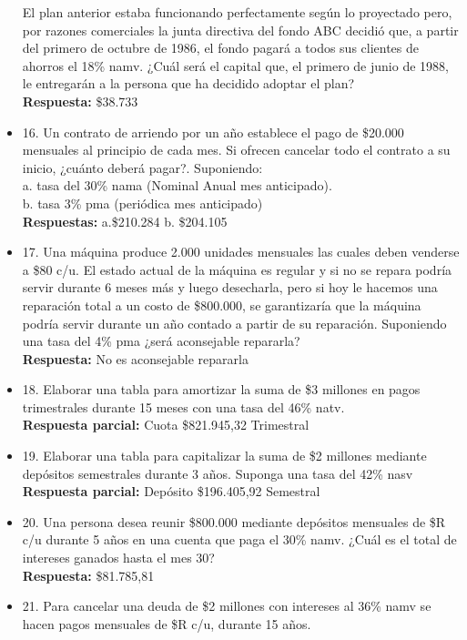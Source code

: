 \begin{itemize}
	El plan anterior estaba funcionando perfectamente según lo proyectado pero, por razones comerciales la junta directiva del fondo ABC decidió que, a partir del primero de octubre de 1986, el fondo pagará a todos sus clientes de ahorros el 18\% namv. ¿Cuál será el capital que, el primero de junio de 1988, le entregarán a la persona que ha decidido adoptar el plan?\\
	
	\textbf{Respuesta:} \$38.733\\
	\medskip
	\item 16. Un contrato de arriendo por un año establece el pago de \$20.000 mensuales al principio de cada mes. Si ofrecen cancelar todo el contrato a su inicio, ¿cuánto deberá pagar?. Suponiendo:\\
	
	a. tasa del 30\% nama (Nominal Anual mes anticipado).\\
	b. tasa 3\% pma (periódica mes anticipado)\\
	\textbf{Respuestas:} a.\$210.284 \hspace{1,5 cm} b. \$204.105\\
	\medskip
	\item 17. Una máquina produce 2.000 unidades mensuales las cuales deben venderse a \$80 c/u. El estado actual de la máquina es regular y si no se repara podría servir durante 6 meses más y luego desecharla, pero si hoy le hacemos una reparación total a un costo de \$800.000, se garantizaría que la máquina podría servir durante un año contado a partir de su reparación. Suponiendo una tasa del 4\% pma ¿será aconsejable repararla?\\
	\textbf{Respuesta:} No es aconsejable repararla\\
	\medskip
	\item 18. Elaborar una tabla para amortizar la suma de \$3 millones en pagos trimestrales durante 15 meses con una tasa del 46\% natv.\\
	\textbf{Respuesta parcial:} Cuota \$821.945,32 Trimestral\\
	\medskip
	\item 19. Elaborar una tabla para capitalizar la suma de \$2 millones mediante depósitos semestrales durante 3 años. Suponga una tasa del 42\% nasv\\
	\textbf{Respuesta parcial:} Depósito \$196.405,92 Semestral\\
	\medskip
	\item 20. Una persona desea reunir \$800.000 mediante depósitos mensuales de \$R c/u durante 5 años en una cuenta que paga el 30\% namv. ¿Cuál es el total de intereses ganados hasta el mes 30?\\
	\textbf{Respuesta:} \$81.785,81\\
	\medskip
	\item 21. Para cancelar una deuda de \$2 millones con intereses al 36\% namv se hacen pagos mensuales de \$R c/u, durante 15 años.\\
	

\end{itemize}
